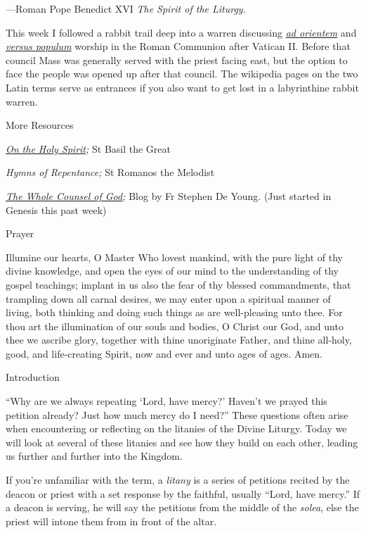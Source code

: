 \documentclass[
]{article}
\begin{document}
---Roman Pope Benedict XVI \emph{The Spirit of the Liturgy.}

This week I followed a rabbit trail deep into a warren discussing
\href{https://en.wikipedia.org/wiki/Ad_orientem}{\emph{ad orientem}} and
\href{https://en.wikipedia.org/wiki/Versus_populum}{\emph{versus
populum}} worship in the Roman Communion after Vatican II. Before that
council Mass was generally served with the priest facing east, but the
option to face the people was opened up after that council. The
wikipedia pages on the two Latin terms serve as entrances if you also
want to get lost in a labyrinthine rabbit warren.

More Resources

\emph{\href{https://www.newadvent.org/fathers/3203.htm}{\ul{On the Holy
Spirit}};} St Basil the Great

\emph{Hymns of Repentance;} St Romanos the Melodist

\emph{\href{https://www.ancientfaith.com/podcasts/wholecounsel}{\ul{The
Whole Counsel of God}};} Blog by Fr Stephen De Young. (Just started in
Genesis this past week)

Prayer

Illumine our hearts, O Master Who lovest mankind, with the pure light of
thy divine knowledge, and open the eyes of our mind to the understanding
of thy gospel teachings; implant in us also the fear of thy blessed
commandments, that trampling down all carnal desires, we may enter upon
a spiritual manner of living, both thinking and doing such things as are
well-pleasing unto thee. For thou art the illumination of our souls and
bodies, O Christ our God, and unto thee we ascribe glory, together with
thine unoriginate Father, and thine all-holy, good, and life-creating
Spirit, now and ever and unto ages of ages. Amen.

Introduction

``Why are we always repeating `Lord, have mercy?' Haven't we prayed this
petition already? Just how much mercy do I need?'' These questions often
arise when encountering or reflecting on the litanies of the Divine
Liturgy. Today we will look at several of these litanies and see how
they build on each other, leading us further and further into the
Kingdom.

If you're unfamiliar with the term, a \emph{litany} is a series of
petitions recited by the deacon or priest with a set response by the
faithful, usually ``Lord, have mercy.'' If a deacon is serving, he will
say the petitions from the middle of the \emph{solea}, else the priest
will intone them from in front of the altar.
\end{document}
